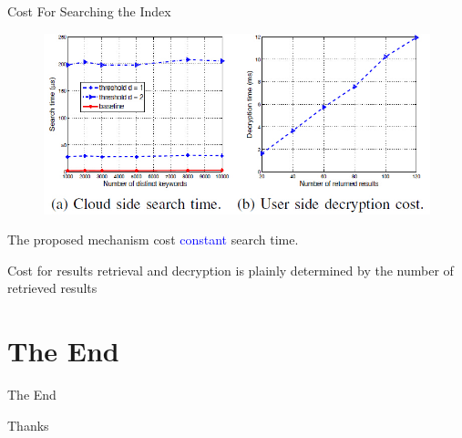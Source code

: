 \documentclass{beamer}
\begin{document}
\begin{frame}{Cost For Searching the Index}
	\begin{figure}
		\includegraphics[width=.75\textwidth]{subfig4.jpg}
	\end{figure}
	\begin{block}{}
		The proposed  mechanism cost \textcolor{blue}{constant} search time.
	\end{block}
	\begin{exampleblock}{}
		Cost for results retrieval and decryption is plainly determined by the \textcolor[rgb]{0.1,0.7,0.2}{number} of retrieved results
	\end{exampleblock}
\end{frame}


\section{The End}
\begin{frame}{The End}
\Huge{\centerline{Thanks}}
\end{frame}

\end{document}
